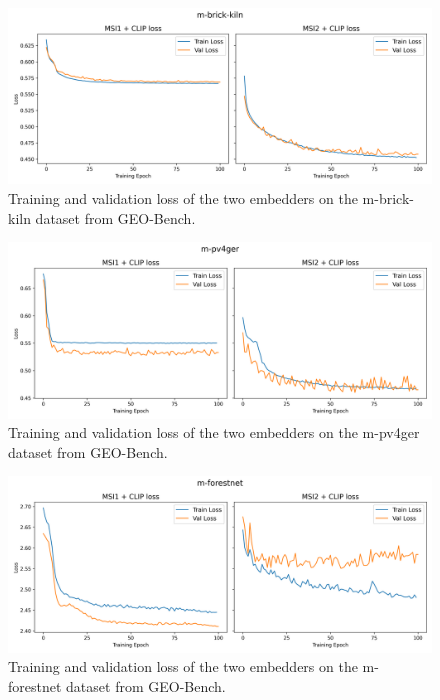 \documentclass[a4paper, oneside, english]{sapthesis}
\begin{document}
\begin{figure}[h]
    \centering
    \includegraphics[width=\textwidth]{img/m-brick-kiln_loss_plot.png}
    \caption{Training and validation loss of the two embedders on the m-brick-kiln dataset from GEO-Bench.}
    \label{fig:brickloss}
\end{figure}

\begin{figure}[h]
    \centering
    \includegraphics[width=\textwidth]{img/m-pv4ger_loss_plot.png}
    \caption{Training and validation loss of the two embedders on the m-pv4ger dataset from GEO-Bench.}
    \label{fig:solarloss}
\end{figure}

\begin{figure}[h]
    \centering
    \includegraphics[width=\textwidth]{img/m-forestnet_loss_plot.png}
    \caption{Training and validation loss of the two embedders on the m-forestnet dataset from GEO-Bench.}
    \label{fig:foresloss}
\end{figure}
\end{document}
